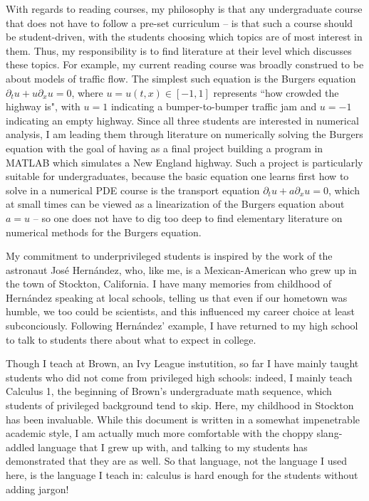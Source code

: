 \documentclass[11pt]{article}
\begin{document}
With regards to reading courses, my philosophy is that any undergraduate course that does not have to follow a pre-set curriculum -- is that such a course should be student-driven, with the students choosing which topics are of most interest in them.
Thus, my responsibility is to find literature at their level which discusses these topics.
For example, my current reading course was broadly construed to be about models of traffic flow.
The simplest such equation is the Burgers equation $\partial_t u + u \partial_x u = 0$, where $u = u(t, x) \in [-1, 1]$ represents ``how crowded the highway is", with $u = 1$ indicating a bumper-to-bumper traffic jam and $u = -1$ indicating an empty highway.
Since all three students are interested in numerical analysis, I am leading them through literature on numerically solving the Burgers equation with the goal of having as a final project building a program in MATLAB which simulates a New England highway.
Such a project is particularly suitable for undergraduates, because the basic equation one learns first how to solve in a numerical PDE course is the transport equation $\partial_t u + a \partial_x u = 0$, which at small times can be viewed as a linearization of the Burgers equation about $a = u$ -- so one does not have to dig too deep to find elementary literature on numerical methods for the Burgers equation.

My commitment to underprivileged students is inspired by the work of the astronaut Jos\'e Hern\'andez, who, like me, is a Mexican-American who grew up in the town of Stockton, California.
I have many memories from childhood of Hern\'andez speaking at local schools, telling us that even if our hometown was humble, we too could be scientists, and this influenced my career choice at least subconciously.
Following Hern\'andez' example, I have returned to my high school to talk to students there about what to expect in college.

Though I teach at Brown, an Ivy League instutition, so far I have mainly taught students who did not come from privileged high schools: indeed, I mainly teach Calculus 1, the beginning of Brown's undergraduate math sequence, which students of privileged background tend to skip.
Here, my childhood in Stockton has been invaluable.
While this document is written in a somewhat impenetrable academic style, I am actually much more comfortable with the choppy slang-addled language that I grew up with, and talking to my students has demonstrated that they are as well.
So that language, not the language I used here, is the language I teach in: calculus is hard enough for the students without adding jargon!
\end{document}
